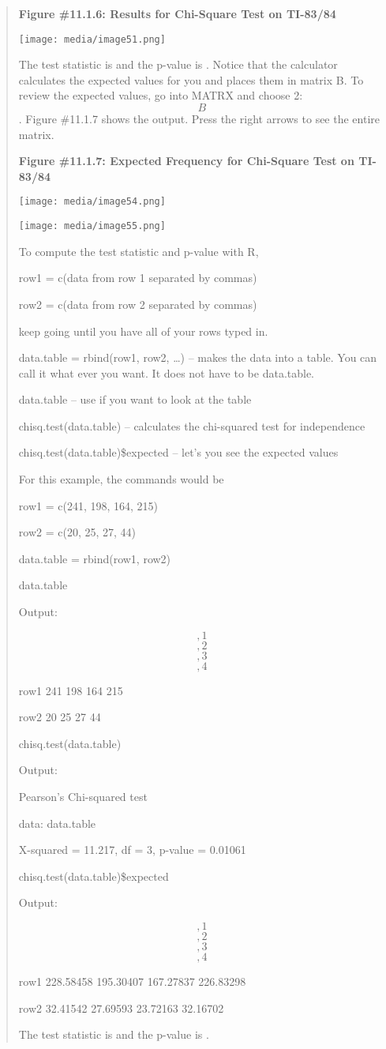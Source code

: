 \documentclass[]{book}
\begin{document}
\begin{quote}
\textbf{Figure \#11.1.6: Results for Chi-Square Test on TI-83/84}

\texttt{[image: media/image51.png]}

The test statistic is and the p-value is . Notice that the calculator calculates the expected values for you and places them in matrix B. To review the expected values, go into MATRX and choose 2:\[B\]. Figure \#11.1.7 shows the output. Press the right arrows to see the entire matrix.

\textbf{Figure \#11.1.7: Expected Frequency for Chi-Square Test on TI-83/84}

\texttt{[image: media/image54.png]}

\texttt{[image: media/image55.png]}

To compute the test statistic and p-value with R,

row1 = c(data from row 1 separated by commas)

row2 = c(data from row 2 separated by commas)

keep going until you have all of your rows typed in.

data.table = rbind(row1, row2, \ldots{}) -- makes the data into a table.
You can call it what ever you want. It does not have to be data.table.

data.table -- use if you want to look at the table

chisq.test(data.table) -- calculates the chi-squared test for
independence

chisq.test(data.table)\$expected -- let's you see the expected values

For this example, the commands would be

row1 = c(241, 198, 164, 215)

row2 = c(20, 25, 27, 44)

data.table = rbind(row1, row2)

data.table

Output:

\[,1\] \[,2\] \[,3\] \[,4\]

row1 241 198 164 215

row2 20 25 27 44

chisq.test(data.table)

Output:

Pearson's Chi-squared test

data: data.table

X-squared = 11.217, df = 3, p-value = 0.01061

chisq.test(data.table)\$expected

Output:

\[,1\] \[,2\] \[,3\] \[,4\]

row1 228.58458 195.30407 167.27837 226.83298

row2 32.41542 27.69593 23.72163 32.16702

The test statistic is and the p-value is .
\end{quote}
\end{document}
